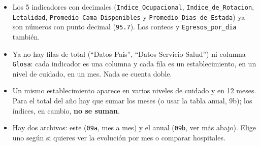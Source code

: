 \documentclass[10.5pt]{article}
\begin{document}
\begin{alertabox}
\begin{itemize}[leftmargin=1.1em,itemsep=2pt,topsep=2pt]
\item Los 5 indicadores con decimales (\texttt{Indice\_\allowbreak{}Ocupacional}, \texttt{Indice\_\allowbreak{}de\_\allowbreak{}Rotacion}, \texttt{Letalidad}, \texttt{Promedio\_\allowbreak{}Cama\_\allowbreak{}Disponibles} y \texttt{Promedio\_\allowbreak{}Dias\_\allowbreak{}de\_\allowbreak{}Estada}) ya son números con punto decimal (\texttt{95.7}). Los conteos y \texttt{Egresos\_\allowbreak{}por\_\allowbreak{}dia} también.
\item Ya no hay filas de total (``Datos País'', ``Datos Servicio Salud'') ni columna \texttt{Glosa}: cada indicador es una columna y cada fila es un establecimiento, en un nivel de cuidado, en un mes. Nada se cuenta doble.
\item Un mismo establecimiento aparece en varios niveles de cuidado y en 12 meses. Para el total del año hay que sumar los meses (o usar la tabla anual, 9b); los índices, en cambio, \textbf{no se suman}.
\item Hay dos archivos: este (\texttt{09a}, mes a mes) y el anual (\texttt{09b}, ver más abajo). Elige uno según si quieres ver la evolución por mes o comparar hospitales.
\end{itemize}
\end{alertabox}

\newpage
{}\label{base9b}\hypertarget{base9b}{}
\end{document}
